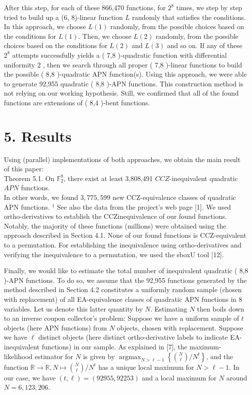 \documentclass[10pt]{article}
\begin{document}
After this step, for each of these 866,470 functions, for $2^{8}$ times, we step by step tried to build up a (6, 8)-linear function $L$ randomly that satisfies the conditions. In this approach, we choose $L(1)$ randomly, from the possible choices based on the conditions for $L(1)$. Then, we choose $L(2)$ randomly, from the possible choices based on the conditions for $L(2)$ and $L(3)$ and so on. If any of these $2^{8}$ attempts successfully yields a ( 7,8 )-quadratic function with differential uniformity 2 , then we search through all proper ( 7,8 )-linear functions to build the possible ( 8,8 )-quadratic APN function(s). Using this approach, we were able to generate 92,955 quadratic ( 8,8 )-APN functions. This construction method is not relying on our working hypothesis. Still, we confirmed that all of the found functions are extensions of ( 8,4 )-bent functions.

\section*{5. Results}
Using (parallel) implementations of both approaches, we obtain the main result of this paper:\\
Theorem 5.1. On $\mathbb{F}_{2}^{8}$, there exist at least 3,808,491 $C C Z$-inequivalent quadratic $A P N$ functions.\\
In other words, we found $3,775,599$ new CCZ-equivalence classes of quadratic APN functions. ${ }^{1}$ See also the data from the project's web page [1]. We used ortho-derivatives to establish the CCZinequivalence of our found functions. Notably, the majority of these functions (millions) were obtained using the approach described in Section 4.1. None of our found functions is CCZ-equivalent to a permutation. For establishing the inequivalence using ortho-derivatives and verifying the inequivalence to a permutation, we used the sboxU tool [12].

Finally, we would like to estimate the total number of inequivalent quadratic ( 8,8 )-APN functions. To do so, we assume that the 92,955 functions generated by the method described in Section 4.2 constitutes a uniformly random sample (chosen with replacement) of all EA-equivalence classes of quadratic APN functions in 8 variables. Let us denote this latter quantity by $N$. Estimating $N$ then boils down to an inverse coupon collector's problem: Suppose we have a uniform sample of $t$ objects (here APN functions) from $N$ objects, chosen with replacement. Suppose we have $\ell$ distinct objects (here distinct ortho-derivative labels to indicate EA-inequivalent functions) in our sample. As explained in [7], the maximum-likelihood estimator for $N$ is given by $\operatorname{argmax}_{N>\ell-1}\left\{\binom{N}{\ell} / N^{t}\right\}$, and the function $\mathbb{R} \rightarrow \mathbb{R}, N \mapsto\binom{N}{\ell} / N^{t}$ has a unique local maximum for $N>\ell-1$. In our case, we have $(t, \ell)=(92955,92253)$ and a local maximum for $N$ around $N=6,123,206$.
\end{document}

